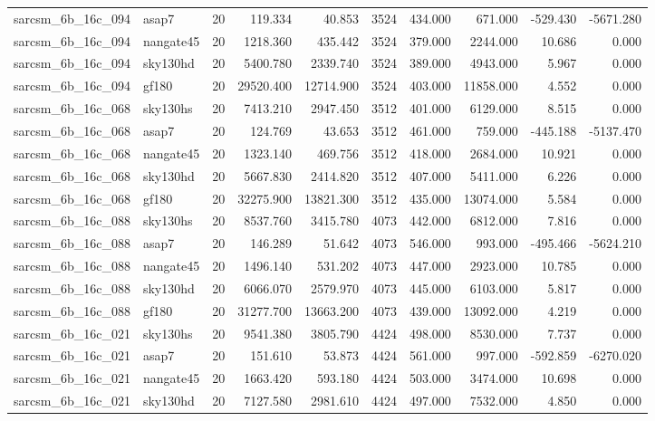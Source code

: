 \begin{tabular}{llrrrrrrrr}
sarcsm\_6b\_16c\_094 & asap7 & 20 & 119.334 & 40.853 & 3524 & 434.000 & 671.000 & -529.430 & -5671.280 \\
sarcsm\_6b\_16c\_094 & nangate45 & 20 & 1218.360 & 435.442 & 3524 & 379.000 & 2244.000 & 10.686 & 0.000 \\
sarcsm\_6b\_16c\_094 & sky130hd & 20 & 5400.780 & 2339.740 & 3524 & 389.000 & 4943.000 & 5.967 & 0.000 \\
sarcsm\_6b\_16c\_094 & gf180 & 20 & 29520.400 & 12714.900 & 3524 & 403.000 & 11858.000 & 4.552 & 0.000 \\
sarcsm\_6b\_16c\_068 & sky130hs & 20 & 7413.210 & 2947.450 & 3512 & 401.000 & 6129.000 & 8.515 & 0.000 \\
sarcsm\_6b\_16c\_068 & asap7 & 20 & 124.769 & 43.653 & 3512 & 461.000 & 759.000 & -445.188 & -5137.470 \\
sarcsm\_6b\_16c\_068 & nangate45 & 20 & 1323.140 & 469.756 & 3512 & 418.000 & 2684.000 & 10.921 & 0.000 \\
sarcsm\_6b\_16c\_068 & sky130hd & 20 & 5667.830 & 2414.820 & 3512 & 407.000 & 5411.000 & 6.226 & 0.000 \\
sarcsm\_6b\_16c\_068 & gf180 & 20 & 32275.900 & 13821.300 & 3512 & 435.000 & 13074.000 & 5.584 & 0.000 \\
sarcsm\_6b\_16c\_088 & sky130hs & 20 & 8537.760 & 3415.780 & 4073 & 442.000 & 6812.000 & 7.816 & 0.000 \\
sarcsm\_6b\_16c\_088 & asap7 & 20 & 146.289 & 51.642 & 4073 & 546.000 & 993.000 & -495.466 & -5624.210 \\
sarcsm\_6b\_16c\_088 & nangate45 & 20 & 1496.140 & 531.202 & 4073 & 447.000 & 2923.000 & 10.785 & 0.000 \\
sarcsm\_6b\_16c\_088 & sky130hd & 20 & 6066.070 & 2579.970 & 4073 & 445.000 & 6103.000 & 5.817 & 0.000 \\
sarcsm\_6b\_16c\_088 & gf180 & 20 & 31277.700 & 13663.200 & 4073 & 439.000 & 13092.000 & 4.219 & 0.000 \\
sarcsm\_6b\_16c\_021 & sky130hs & 20 & 9541.380 & 3805.790 & 4424 & 498.000 & 8530.000 & 7.737 & 0.000 \\
sarcsm\_6b\_16c\_021 & asap7 & 20 & 151.610 & 53.873 & 4424 & 561.000 & 997.000 & -592.859 & -6270.020 \\
sarcsm\_6b\_16c\_021 & nangate45 & 20 & 1663.420 & 593.180 & 4424 & 503.000 & 3474.000 & 10.698 & 0.000 \\
sarcsm\_6b\_16c\_021 & sky130hd & 20 & 7127.580 & 2981.610 & 4424 & 497.000 & 7532.000 & 4.850 & 0.000 \\

\end{tabular}
